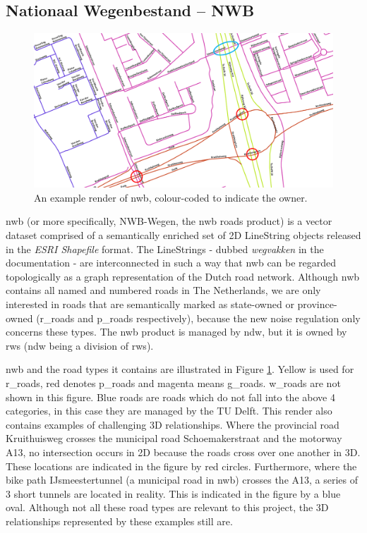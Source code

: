 \subsection{Nationaal Wegenbestand – NWB}
\label{sub:nwb}

\begin{figure}
    \centering
    \includegraphics[width=\linewidth]{final_report/figs/nwb_sample_02.png} 
    \caption{An example render of \ac{nwb}, colour-coded to indicate the owner.}
    \label{fig:nwb}
\end{figure}

\ac{nwb} (or more specifically, NWB-Wegen, the \ac{nwb} roads product) is a vector dataset comprised of a semantically enriched set of 2D LineString objects released in the \textit{ESRI Shapefile} format. The LineStrings - dubbed \textit{wegvakken} in the documentation - are interconnected in such a way that \ac{nwb} can be regarded topologically as a graph representation of the Dutch road network. Although \ac{nwb} contains all named and numbered roads in The Netherlands, we are only interested in roads that are semantically marked as state-owned or province-owned (\ac{r_roads} and \ac{p_roads} respectively), because the new noise regulation only concerns these types. The \ac{nwb} product is managed by \ac{ndw}, but it is owned by \ac{rws} (\ac{ndw} being a division of \ac{rws}).

\ac{nwb} and the road types it contains are illustrated in Figure \ref{fig:nwb}. Yellow is used for \ac{r_roads}, red denotes \ac{p_roads} and magenta means \ac{g_roads}. \ac{w_roads} are not shown in this figure. Blue roads are roads which do not fall into the above 4 categories, in this case they are managed by the TU Delft. This render also contains examples of challenging 3D relationships. Where the provincial road Kruithuisweg crosses the municipal road Schoemakerstraat and the motorway A13, no intersection occurs in 2D because the roads cross over one another in 3D. These locations are indicated in the figure by red circles. Furthermore, where the bike path IJsmeestertunnel (a municipal road in \ac{nwb}) crosses the A13, a series of 3 short tunnels are located in reality. This is indicated in the figure by a blue oval. Although not all these road types are relevant to this project, the 3D relationships represented by these examples still are.

